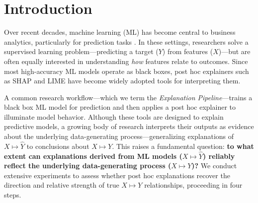 \documentclass[11pt]{article}
\begin{document}
\section{Introduction}

Over recent decades, machine learning (ML) has become central to business analytics, particularly for prediction tasks \citep{kleinberg2015prediction,mullainathan17applied}. In these settings, researchers solve a supervised learning problem—predicting a target ($Y$) from features ($X$)—but are often equally interested in understanding \textit{how} features relate to outcomes. Since most high-accuracy ML models operate as black boxes, post hoc explainers such as SHAP \citep{lundberg17shap} and LIME \citep{ribeiro16lime} have become widely adopted tools for interpreting them.

A common research workflow—which we term the \emph{Explanation Pipeline}—trains a black box ML model for prediction and then applies a post hoc explainer to illuminate model behavior. %
Although these tools are designed to explain predictive models, a growing body of research interprets their outputs as evidence about the underlying data-generating process—generalizing explanations of $X \mapsto \hat{Y}$ to conclusions about $X \mapsto Y$. %
This raises a fundamental question: \textbf{to what extent can explanations derived from ML models ($X \mapsto \hat{Y}$) reliably reflect the underlying data-generating process ($X \mapsto Y$)?} We conduct extensive experiments to assess whether post hoc explanations recover the direction and relative strength of true $X \mapsto Y$ relationships, proceeding in four steps.
\end{document}
